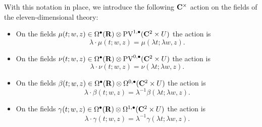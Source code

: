 %
%
%
%

With this notation in place, we introduce the following $\mathbf{C}^\times$ action on the fields of the eleven-dimensional theory:
\begin{itemize}
\item On the fields $\mu(t;w,z) \in \Omega^\bullet(\mathbf{R}) \otimes {\rm PV}^{1,\bullet}(\mathbf{C}^2 \times U)$ the action is
\[
\lambda \cdot \mu(t;w,z) = \mu(\lambda t;\lambda w , z).
\]
\item On the fields $\nu(t;w,z) \in \Omega^\bullet(\mathbf{R}) \otimes {\rm PV}^{0,\bullet}(\mathbf{C}^2 \times U)$ the action is
\[
\lambda \cdot \nu(t;w,z) = \nu(\lambda t;\lambda w , z).
\]
\item On the fields $\beta(t;w,z) \in \Omega^\bullet(\mathbf{R}) \otimes \Omega^{0,\bullet}(\mathbf{C}^2 \times U)$ the action is
\[
\lambda \cdot \beta(t;w,z) = \lambda^{-1} \beta(\lambda t;\lambda w , z).
\]
\item On the fields $\gamma(t;w,z) \in \Omega^\bullet(\mathbf{R}) \otimes \Omega^{1,\bullet}(\mathbf{C}^2 \times U)$ the action is
\[
\lambda \cdot \gamma(t;w,z) = \lambda^{-1} \gamma(\lambda t;\lambda w , z).
\]
\end{itemize}

